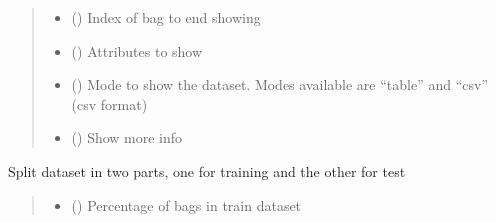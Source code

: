 \documentclass[letterpaper,10pt,english]{sphinxmanual}
\begin{document}
\begin{fulllineitems}
\begin{fulllineitems}
\begin{quote}
\begin{description}
\begin{itemize}
\item {} 
\sphinxAtStartPar
{} () \textendash{} Index of bag to end showing

\item {} 
\sphinxAtStartPar
{} () \textendash{} Attributes to show

\item {} 
\sphinxAtStartPar
{} () \textendash{} Mode to show the dataset. Modes available are “table” and “csv” (csv format)

\item {} 
\sphinxAtStartPar
{} () \textendash{} Show more info

\end{itemize}

\end{description}\end{quote}

\end{fulllineitems}


\begin{fulllineitems}
\label{\detokenize{data/_autosummary/miml.data.miml_dataset.MIMLDataset:miml.data.miml_dataset.MIMLDataset.split_dataset}}
\pysigstartsignatures
\pysiglinewithargsret
{}
{\sphinxparamcomma {}}
{}
\pysigstopsignatures
\sphinxAtStartPar
Split dataset in two parts, one for training and the other for test
\begin{quote}\begin{description}
\begin{itemize}
\item {} 
\sphinxAtStartPar
{} () \textendash{} Percentage of bags in train dataset


\end{itemize}
\end{description}
\end{quote}
\end{fulllineitems}
\end{fulllineitems}
\end{document}
